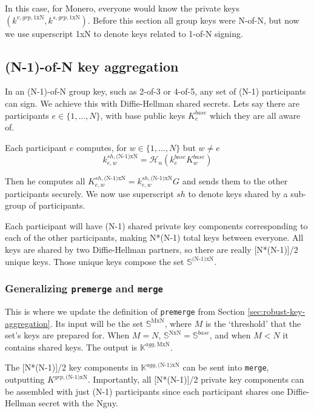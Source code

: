 In this case, for Monero, everyone would know the private keys $(k^{v,grp,{1\textrm{xN}}},k^{s,grp,{1\textrm{xN}}})$. Before this section all group keys were N-of-N, but now we use superscript 1xN to denote keys related to 1-of-N signing.


\subsection{(N-1)-of-N key aggregation}
\label{sec:n-1-of-n}

In an (N-1)-of-N group key, such as 2-of-3 or 4-of-5, any set of (N-1) participants can sign. We achieve this with Diffie-Hellman shared secrets. Lets say there are participants $e \in \{1,...,N\}$, with base public keys $K^{base}_e$ which they are all aware of.

Each participant $e$ computes, for $w \in \{1,...,N\}$ but $w \neq e$\vspace{.175cm}
\[k^{sh,\textrm{(N-1)xN}}_{e,w} = \mathcal{H}_n(k^{base}_e K^{base}_w)\]

Then he computes all $K^{sh,\textrm{(N-1)xN}}_{e,w} = k^{sh,\textrm{(N-1)xN}}_{e,w} G$ and sends them to the other participants securely. We now use superscript $sh$ to denote keys shared by a sub-group of participants.

Each participant will have (N-1) shared private key components corresponding to each of the other participants, making N*(N-1) total keys between everyone. All keys are shared by two Diffie-Hellman partners, so there are really [N*(N-1)]/2 unique keys. Those unique keys compose the set $\mathbb{S}^{\textrm{(N-1)xN}}$.

\subsubsection*{Generalizing {\tt premerge} and {\tt merge}}

This is where we update the definition of {\tt premerge} from Section \ref{sec:robust-key-aggregation}. Its input will be the set $\mathbb{S}^{\textrm{MxN}}$, where $M$ is the `threshold' that the set's keys are prepared for. When $M = N$, $\mathbb{S}^{\textrm{NxN}} = \mathbb{S}^{base}$, and when $M < N$ it contains shared keys. The output is $\mathbb{K}^{agg,\textrm{MxN}}$.

The [N*(N-1)]/2 key components in $\mathbb{K}^{agg,\textrm{(N-1)xN}}$ can be sent into {\tt merge}, outputting $K^{grp,\textrm{(N-1)xN}}$. Importantly, all [N*(N-1)]/2 private key components can be assembled with just (N-1) participants since each participant shares one Diffie-Hellman secret with the N\nth guy.

